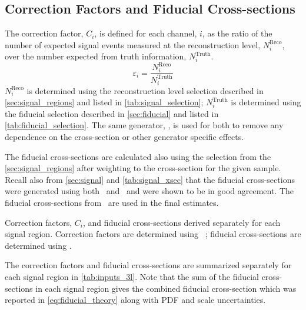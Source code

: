 \subsection{Correction Factors and Fiducial Cross-sections}
\label{sec:inputs}

The correction factor, $C_i$, is defined for each channel, $i$,
as the ratio of the number of expected signal events measured
at the reconstruction level, $N_i^{\textrm{Reco}}$, over the number
expected from truth information, $N_i^{\textrm{Truth}}$.
\begin{equation}
\varepsilon_i = \frac{N_i^{\textrm{Reco}}}{N_i^{\textrm{Truth}}}
\end{equation}
$N_i^{\textrm{Reco}}$ 
is determined using the reconstruction
level selection described in \sec\ref{sec:signal_regions} and
listed in \tab\ref{tab:signal_selection};
$N_i^{\textrm{Truth}}$  is determined using the fiducial
selection described in \sec\ref{sec:fiducial} and 
listed in \tab\ref{tab:fiducial_selection}. The same generator, 
\vbfnlo, is used for both to remove any dependence on the 
cross-section or other generator specific effects.

The fiducial cross-sections are calculated also using the selection
from the \sec\ref{sec:signal_regions} after weighting
to the cross-section for the given sample. Recall also 
from \sec\ref{sec:signal} and \tab\ref{tab:signal_xsec}
that the fiducial cross-sections were generated using
both \madgraph~and \vbfnlo~and were shown to be in good agreement.
The fiducial cross-sections from \madgraph~are used in the final
estimates.

\begin{table}[ht!]
\centering

\caption{Correction factors, $C_i$, and fiducial cross-sections derived
separately for each signal region. Correction factors are determined
using \vbfnlo~; fiducial cross-sections are determined
using \madgraph.}
\label{tab:inputs_3l}
\end{table}

The correction factors and fiducial cross-sections are 
summarized separately for each signal region in 
\tab\ref{tab:inputs_3l}.
Note that the sum of the fiducial cross-sections
in each signal region gives the combined fiducial cross-section
which was reported in \eqn\ref{eq:fiducial_theory} along with 
PDF and scale uncertainties.

